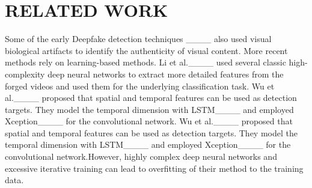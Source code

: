 \section{RELATED WORK}
Some of the early Deepfake detection techniques ____ also used visual biological artifacts to identify the authenticity of visual content. More recent methods  rely on  learning-based methods. Li et al.____ used several classic high-complexity deep neural networks to extract more detailed features from the forged videos and used them for the underlying classification task. Wu et al.____ proposed that spatial and temporal features can be used as detection targets. They model the temporal dimension with LSTM____ and employed  Xception____ for the convolutional network. Wu et al.____ proposed that spatial and temporal features can be used as detection targets. They model the temporal dimension with LSTM____ and employed  Xception____ for the convolutional network.However, highly complex deep neural networks and excessive iterative training can lead to overfitting of their method to the training data.